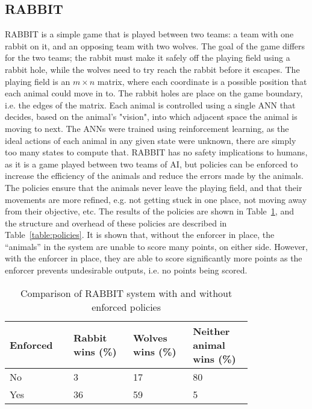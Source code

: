 \subsection{RABBIT} \label{sec:rabbit}
RABBIT is a simple game that is played between two teams: a team with one rabbit on it, and an opposing team with two wolves. 
The goal of the game differs for the two teams; the rabbit must make it safely off the playing field using a rabbit hole, while the wolves need to try reach the rabbit before it escapes.
The playing field is an $m\times{n}$ matrix, where each coordinate is a possible position that each animal could move in to.
The rabbit holes are place on the game boundary, i.e. the edges of the matrix.
Each animal is controlled using a single \ac{ANN} that decides, based on the animal's "vision", into which adjacent space the animal is moving to next.
The \acp{ANN} were trained using reinforcement learning, as the ideal actions of each animal in any given state were unknown, there are simply too many states to compute that.
RABBIT has no safety implications to humans, as it is a game played between two teams of \ac{AI}, but policies can be enforced to increase the efficiency of the animals and reduce the errors made by the animals.
The policies ensure that the animals never leave the playing field, and that their movements are more refined, e.g. not getting stuck in one place, not moving away from their objective, etc.
The results of the policies are shown in Table~\ref{table:rabbitres}, and the structure and overhead of these policies are described in Table~\ref{table:policies}.
It is shown that, without the enforcer in place, the ``animals'' in the system are unable to score many points, on either side.
However, with the enforcer in place, they are able to score significantly more points as the enforcer prevents undesirable outputs, i.e. no points being scored.

\begin{table}[H]
	\centering
	\caption{Comparison of RABBIT system with and without enforced policies}
	\label{table:rabbitres}
	\begin{tabular}{|p{0.2\linewidth}|p{0.2\linewidth}|p{0.2\linewidth}|p{0.2\linewidth}|}
		\hline Enforced & Rabbit wins (\%) &  Wolves wins (\%) & Neither animal wins (\%) \\ \hline
		No & 3 & 17 & 80 \\
		Yes & 36 & 59 & 5 \\ \hline       
	\end{tabular}
\end{table}
